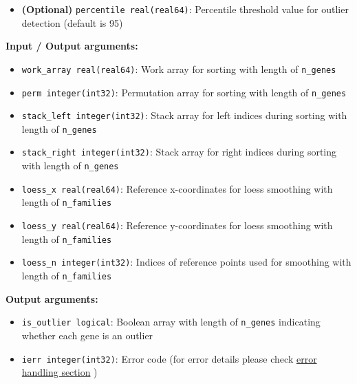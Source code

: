 \begin{enumerate}
\begin{itemize}
            \item \textbf{(Optional)} \texttt{percentile real(real64)}:
                  Percentile threshold value for outlier detection (default is 95)
          \end{itemize}
          
          \textbf{Input / Output arguments:}
          \begin{itemize}
            \item \texttt{work\_array real(real64)}: Work array for sorting with
                  length of \texttt{n\_genes}
                  
            \item \texttt{perm integer(int32)}: Permutation array for sorting with
                  length of \texttt{n\_genes}
                  
            \item \texttt{stack\_left integer(int32)}: Stack array for left indices
                  during sorting with length of \texttt{n\_genes}
                  
            \item \texttt{stack\_right integer(int32)}: Stack array for right indices
                  during sorting with length of \texttt{n\_genes}
                  
            \item \texttt{loess\_x real(real64)}: Reference x-coordinates for loess
                  smoothing with length of \texttt{n\_families}
                  
            \item \texttt{loess\_y real(real64)}: Reference y-coordinates for loess
                  smoothing with length of \texttt{n\_families}
                  
            \item \texttt{loess\_n integer(int32)}: Indices of reference points used
                  for smoothing with length of \texttt{n\_families}
          \end{itemize}
          
          \textbf{Output arguments:}
          \begin{itemize}
            \item \texttt{is\_outlier logical}: Boolean array with length of \texttt{n\_genes}
                  indicating whether each gene is an outlier
                  
            \item \texttt{ierr integer(int32)}: Error code (for error details
                  please check \hyperref[sec:error-handling]{error handling section}
                  )
          \end{itemize}
          

\end{enumerate}
